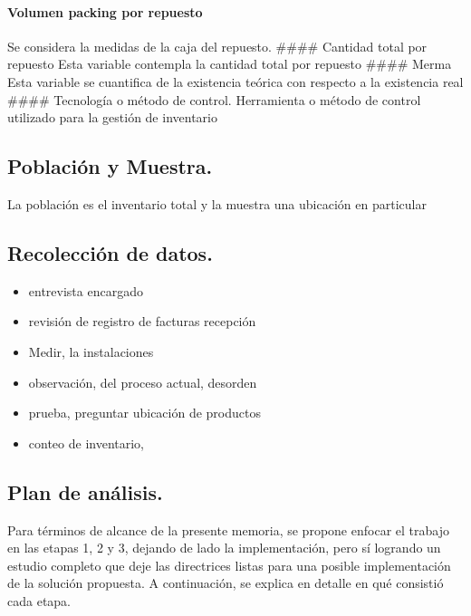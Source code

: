 \documentclass[11pt]{article}
\providecommand{\tightlist}{%
      \setlength{\itemsep}{0pt}\setlength{\parskip}{0pt}}
\begin{document}
\hypertarget{volumen-packing-por-repuesto}{%
\paragraph{Volumen packing por
repuesto}\label{volumen-packing-por-repuesto}}

Se considera la medidas de la caja del repuesto. \#\#\#\# Cantidad total
por repuesto Esta variable contempla la cantidad total por repuesto
\#\#\#\# Merma Esta variable se cuantifica de la existencia teórica con
respecto a la existencia real \#\#\#\# Tecnología o método de control.
Herramienta o método de control utilizado para la gestión de inventario

\hypertarget{poblaciuxf3n-y-muestra.}{%
\subsection{Población y Muestra.}\label{poblaciuxf3n-y-muestra.}}

La población es el inventario total y la muestra una ubicación en
particular

\hypertarget{recolecciuxf3n-de-datos.}{%
\subsection{Recolección de datos.}\label{recolecciuxf3n-de-datos.}}

\begin{itemize}
\tightlist
\item
  entrevista encargado
\item
  revisión de registro de facturas recepción
\item
  Medir, la instalaciones
\item
  observación, del proceso actual, desorden
\item
  prueba, preguntar ubicación de productos
\item
  conteo de inventario,
\end{itemize}

\hypertarget{plan-de-anuxe1lisis.}{%
\subsection{Plan de análisis.}\label{plan-de-anuxe1lisis.}}

Para términos de alcance de la presente memoria, se propone enfocar el
trabajo en las etapas 1, 2 y 3, dejando de lado la implementación, pero
sí logrando un estudio completo que deje las directrices listas para una
posible implementación de la solución propuesta. A continuación, se
explica en detalle en qué consistió cada etapa.
\end{document}
